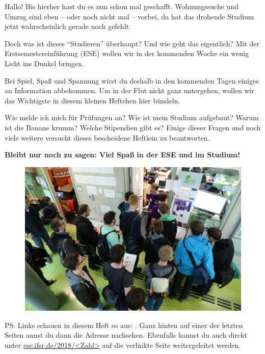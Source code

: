 

Hallo! Bis hierher hast du es nun schon mal geschafft. Wohnungssuche und Umzug sind eben -- oder noch nicht mal -- vorbei, da hat das drohende Studium jetzt wahrscheinlich gerade noch gefehlt.

Doch was ist dieses \enquote{Studieren} überhaupt? Und wie geht das eigentlich? Mit der Erstsemestereinführung (ESE) wollen wir in der kommenden Woche ein wenig Licht ins Dunkel bringen.



Bei Spiel, Spaß und Spannung wirst du deshalb in den kommenden Tagen einiges an Information abbekommen. Um in der Flut nicht ganz untergehen, wollen wir das Wichtigste in diesem kleinen Heftchen hier bündeln.

Wie melde ich mich für Prüfungen an?  Wie ist mein Studium aufgebaut? Warum ist die Banane krumm? Welche Stipendien gibt es?
Einige dieser Fragen und noch viele weitere versucht dieses bescheidene Heftlein zu beantworten. %

\textbf{Bleibt nur noch zu sagen: Viel Spaß in der ESE und im Studium!}

\begin{figure}[b!]
	\centering
	\includegraphics[trim={0 5.5cm 0 0}, clip, width=\linewidth]{img/ese2015/bueroansturm.jpg}
\end{figure}%

\bigskip
{\small PS\@: Links schauen in diesem Heft so aus: . Ganz hinten auf einer der letzten Seiten annst du dann die Adresse nachsehen. Ebenfalls kannst du auch direkt unter \url{ese.ifsr.de/2018/<Zahl>} auf die verlinkte Seite weitergeleitet werden.}
